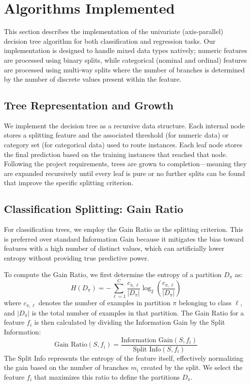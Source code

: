 \documentclass[twoside,11pt]{article}
\begin{document}
\section{Algorithms Implemented}
This section describes the implementation of the univariate (axis-parallel) decision tree algorithm for both classification and regression tasks. Our implementation is designed to handle mixed data types natively; numeric features are processed using binary splits, while categorical (nominal and ordinal) features are processed using multi-way splits where the number of branches is determined by the number of discrete values present within the feature.

\subsection{Tree Representation and Growth}
We implement the decision tree as a recursive data structure. Each internal node stores a splitting feature and the associated threshold (for numeric data) or category set (for categorical data) used to route instances. Each leaf node stores the final prediction based on the training instances that reached that node. Following the project requirements, trees are grown to completion—meaning they are expanded recursively until every leaf is pure or no further splits can be found that improve the specific splitting criterion.

\subsection{Classification Splitting: Gain Ratio}
For classification trees, we employ the Gain Ratio \citep{quinlan1993} as the splitting criterion. This is preferred over standard Information Gain because it mitigates the bias toward features with a high number of distinct values, which can artificially lower entropy without providing true predictive power. 

To compute the Gain Ratio, we first determine the entropy of a partition $D_\pi$ as:
\begin{equation}
H(D_\pi) = -\sum_{\ell=1}^{C} \frac{c_{\pi,\ell}}{|D_\pi|} \log_2 \left( \frac{c_{\pi,\ell}}{|D_\pi|} \right)
\end{equation}
where $c_{\pi,\ell}$ denotes the number of examples in partition $\pi$ belonging to class $\ell$, and $|D_\pi|$ is the total number of examples in that partition. The Gain Ratio for a feature $f_i$ is then calculated by dividing the Information Gain by the Split Information:
\begin{equation}
\text{Gain Ratio}(S, f_i) = \frac{\text{Information Gain}(S, f_i)}{\text{Split Info}(S, f_i)}
\end{equation}
The Split Info represents the entropy of the feature itself, effectively normalizing the gain based on the number of branches $m_i$ created by the split. We select the feature $f_i$ that maximizes this ratio to define the partitions $D_\pi$.
\end{document}
